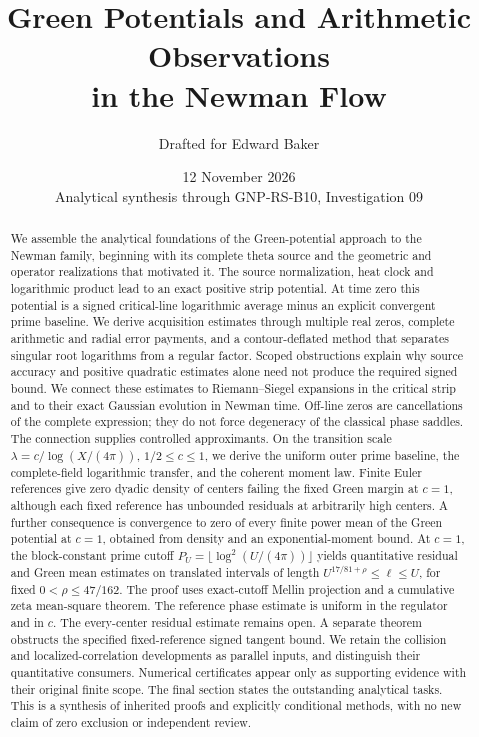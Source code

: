 \documentclass[11pt]{article}
\title{Green Potentials and Arithmetic Observations\\in the Newman Flow}
\author{Drafted for Edward Baker}
\date{12 November 2026\\\small Analytical synthesis through GNP-RS-B10, Investigation 09}
\theoremstyle{definition}
\theoremstyle{remark}
\numberwithin{equation}{section}
\begin{document}
\maketitle
\begin{abstract}
We assemble the analytical foundations of the Green-potential approach
to the Newman family, beginning with its complete theta source and the
geometric and operator realizations that motivated it. The source
normalization, heat clock and logarithmic product lead to an exact
positive strip potential. At time zero this potential is a signed
critical-line logarithmic average minus an explicit convergent prime
baseline. We derive acquisition estimates through multiple real zeros,
complete arithmetic and radial error payments, and a contour-deflated
method that separates singular root logarithms from a regular factor.
Scoped obstructions explain why source accuracy and positive
quadratic estimates alone need not produce the required signed bound.
We connect these estimates to Riemann--Siegel expansions in the
critical strip and to their exact Gaussian evolution in Newman time.
Off-line zeros are cancellations of the complete expression; they do
not force degeneracy of the classical phase saddles. The connection
supplies controlled approximants. On the transition scale
\(\lambda=c/\log(X/(4\pi))\), \(1/2\le c\le1\), we derive the
uniform outer prime baseline, the complete-field logarithmic transfer,
and the coherent moment law. Finite Euler references give zero dyadic
density of centers failing the fixed Green margin at \(c=1\), although
each fixed reference has unbounded residuals at arbitrarily high centers.
A further consequence is convergence to zero of every finite power
mean of the Green potential at \(c=1\), obtained from density and
an exponential-moment bound. At \(c=1\), the block-constant prime
cutoff \(P_U=\lfloor \log^2(U/(4\pi))\rfloor\) yields quantitative
residual and Green mean estimates on translated intervals of length
\(U^{17/81+\rho}\le\ell\le U\), for fixed \(0<\rho\le47/162\).
The proof uses exact-cutoff Mellin projection and a cumulative zeta
mean-square theorem. The reference phase estimate is uniform in
the regulator and in \(c\). The every-center residual estimate
remains open.
A separate theorem obstructs the specified fixed-reference signed
tangent bound. We retain the collision and localized-correlation developments as
parallel inputs, and distinguish their quantitative consumers. Numerical
certificates appear only as supporting evidence with their original
finite scope. The final section states the outstanding analytical tasks.
This is a synthesis of inherited proofs and explicitly conditional
methods, with no new claim of zero exclusion or independent review.
\end{abstract}
\end{document}
